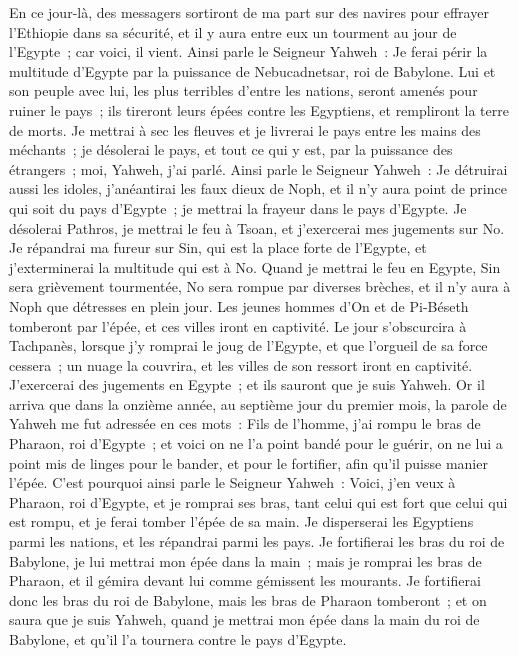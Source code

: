 \begin{multicols}{2}
En ce jour-là, des messagers sortiront de ma part sur des navires pour effrayer l'Ethiopie dans sa sécurité, et il y aura entre eux un tourment au jour de l'Egypte~; car voici, il vient.
Ainsi parle le Seigneur Yahweh~: Je ferai périr la multitude d'Egypte par la puissance de Nebucadnetsar, roi de Babylone.
Lui et son peuple avec lui, les plus terribles d'entre les nations, seront amenés pour ruiner le pays~; ils tireront leurs épées contre les Egyptiens, et rempliront la terre de morts.
Je mettrai à sec les fleuves et je livrerai le pays entre les mains des méchants~; je désolerai le pays, et tout ce qui y est, par la puissance des étrangers~; moi, Yahweh, j'ai parlé.
Ainsi parle le Seigneur Yahweh~: Je détruirai aussi les idoles, j'anéantirai les faux dieux de Noph, et il n'y aura point de prince qui soit du pays d'Egypte~; je mettrai la frayeur dans le pays d'Egypte.
Je désolerai Pathros, je mettrai le feu à Tsoan, et j'exercerai mes jugements sur No.
Je répandrai ma fureur sur Sin, qui est la place forte de l'Egypte, et j'exterminerai la multitude qui est à No.
Quand je mettrai le feu en Egypte, Sin sera grièvement tourmentée, No sera rompue par diverses brèches, et il n'y aura à Noph que détresses en plein jour.
Les jeunes hommes d'On et de Pi-Béseth tomberont par l'épée, et ces villes iront en captivité.
Le jour s'obscurcira à Tachpanès, lorsque j'y romprai le joug de l'Egypte, et que l'orgueil de sa force cessera~; un nuage la couvrira, et les villes de son ressort iront en captivité.
J'exercerai des jugements en Egypte~; et ils sauront que je suis Yahweh.
Or il arriva que dans la onzième année, au septième jour du premier mois, la parole de Yahweh me fut adressée en ces mots~:
Fils de l'homme, j'ai rompu le bras de Pharaon, roi d'Egypte~; et voici on ne l'a point bandé pour le guérir, on ne lui a point mis de linges pour le bander, et pour le fortifier, afin qu'il puisse manier l'épée.
C'est pourquoi ainsi parle le Seigneur Yahweh~: Voici, j'en veux à Pharaon, roi d'Egypte, et je romprai ses bras, tant celui qui est fort que celui qui est rompu, et je ferai tomber l'épée de sa main.
Je disperserai les Egyptiens parmi les nations, et les répandrai parmi les pays.
Je fortifierai les bras du roi de Babylone, je lui mettrai mon épée dans la main~; mais je romprai les bras de Pharaon, et il gémira devant lui comme gémissent les mourants.
Je fortifierai donc les bras du roi de Babylone, mais les bras de Pharaon tomberont~; et on saura que je suis Yahweh, quand je mettrai mon épée dans la main du roi de Babylone, et qu'il l'a tournera contre le pays d'Egypte.

\end{multicols}
